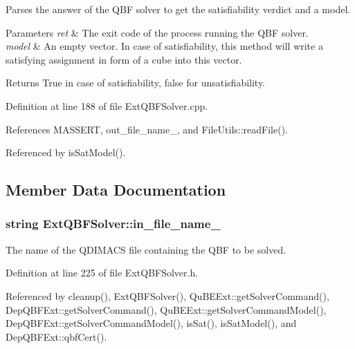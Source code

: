 Parses the answer of the Q\-B\-F solver to get the satisfiability verdict and a model. 


\begin{DoxyParams}{Parameters}
{\em ret} & The exit code of the process running the Q\-B\-F solver. \\
\hline
{\em model} & An empty vector. In case of satisfiability, this method will write a satisfying assignment in form of a cube into this vector. \\
\hline
\end{DoxyParams}
\begin{DoxyReturn}{Returns}
True in case of satisfiability, false for unsatisfiability. 
\end{DoxyReturn}


Definition at line 188 of file Ext\-Q\-B\-F\-Solver.\-cpp.



References M\-A\-S\-S\-E\-R\-T, out\-\_\-file\-\_\-name\-\_\-, and File\-Utils\-::read\-File().



Referenced by is\-Sat\-Model().



\subsection{Member Data Documentation}
\hypertarget{classExtQBFSolver_a04d2ff483c22a11344e46d66ae7e76b1}{
\subsubsection[{in\-\_\-file\-\_\-name\-\_\-}]{\setlength{\rightskip}{0pt plus 5cm}string Ext\-Q\-B\-F\-Solver\-::in\-\_\-file\-\_\-name\-\_\-\hspace{0.3cm}{\ttfamily [protected]}}}\label{classExtQBFSolver_a04d2ff483c22a11344e46d66ae7e76b1}


The name of the Q\-D\-I\-M\-A\-C\-S file containing the Q\-B\-F to be solved. 



Definition at line 225 of file Ext\-Q\-B\-F\-Solver.\-h.



Referenced by cleanup(), Ext\-Q\-B\-F\-Solver(), Qu\-B\-E\-Ext\-::get\-Solver\-Command(), Dep\-Q\-B\-F\-Ext\-::get\-Solver\-Command(), Qu\-B\-E\-Ext\-::get\-Solver\-Command\-Model(), Dep\-Q\-B\-F\-Ext\-::get\-Solver\-Command\-Model(), is\-Sat(), is\-Sat\-Model(), and Dep\-Q\-B\-F\-Ext\-::qbf\-Cert().


